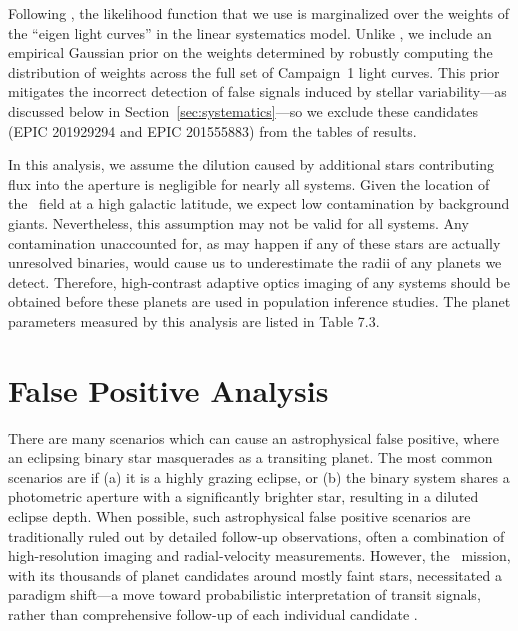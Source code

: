 Following \paperit, the likelihood function that we use is marginalized over
the weights of the ``eigen light curves'' in the linear systematics model.
Unlike \paperit, we include an empirical Gaussian prior on the weights
determined by robustly computing the distribution of weights across the full
set of Campaign~1 light curves.
This prior mitigates the incorrect detection of false signals induced by
stellar variability---as discussed below in Section~\ref{sec:systematics}---so
we exclude these candidates (EPIC 201929294 and EPIC 201555883) from the tables
of results.


In this analysis, we assume the dilution caused by additional stars
contributing flux into the aperture is negligible for nearly all systems.
Given the location of the \Ci\ field at a high galactic latitude, we expect
low contamination by background giants.
Nevertheless, this assumption may not be valid for all systems.
Any contamination unaccounted for, as may happen if any of these stars are
actually unresolved binaries, would cause us to underestimate the radii of any
planets we detect.
Therefore, high-contrast adaptive optics imaging of any systems should be
obtained before these planets are used in population inference studies.
The planet parameters measured by this analysis are listed in Table 7.3.



\section{False Positive Analysis}


There are many scenarios which can cause an astrophysical false positive,
where an eclipsing binary star masquerades as a transiting planet.
The most common scenarios are if (a) it is a highly grazing eclipse, or (b) the binary system
shares a photometric aperture with a significantly brighter star,
resulting in a diluted eclipse depth.
When possible, such astrophysical false positive scenarios are traditionally
ruled out by detailed follow-up observations, often a combination of
high-resolution imaging and radial-velocity measurements.
However, the \kep\ mission, with its thousands of planet candidates
around mostly faint stars, necessitated a paradigm shift---a move
toward probabilistic interpretation of transit signals, rather than
comprehensive follow-up of each individual candidate \citep{Morton11b}.


